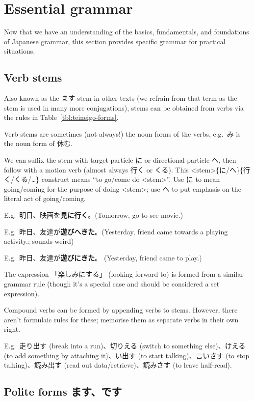 \documentclass[../nihongo-gakushuu-kyouzai.tex]{subfiles}
\begin{document}
\setcounter{section}{2}
\section{Essential grammar} \label{sec:essential-grammar}

Now that we have an understanding of the basics, fundamentals, and foundations of Japanese grammar, this section provides specific grammar for practical situations.

\subsection{Verb stems}

Also known as the ます-stem in other texts (we refrain from that term as the stem is used in many more conjugations), stems can be obtained from verbs via the rules in Table~\ref{tbl:teineigo-forms}.

Verb stems are sometimes (not always!) the noun forms of the verbs, e.g.\ み is the noun form of 休む.

We can suffix the stem with target particle に or directional particle へ, then follow with a motion verb (almost always 行く or くる). This <stem>\{に/へ\}\{行く/くる/\dots\} construct means ``to go/come do <stem>''. Use に to mean going/coming for the purpose of doing <stem>; use へ to put emphasis on the literal act of going/coming.

E.g.\ 明日、映画を\textbf{見に行く}。(Tomorrow, go to see movie.)

E.g.\ 昨日、友達が\textbf{遊びへきた}。(Yesterday, friend came towards a playing activity.; sounds weird)

E.g.\ 昨日、友達が\textbf{遊びにきた}。 (Yesterday, friend came to play.)

The expression 「楽しみにする」 (looking forward to) is formed from a similar grammar rule (though it's a special case and should be considered a set expression).

Compound verbs can be formed by appending verbs to stems. However, there aren't formulaic rules for these; memorise them as separate verbs in their own right.

E.g.\ 走り出す (break into a run)、切りえる (switch to something else)、けえる (to add something by attaching it)、い出す (to start talking)、言いさす (to stop talking)、読み出す (read out data/retrieve)、読みさす (to leave half-read).


\subsection{Polite forms ます、です}
\end{document}
